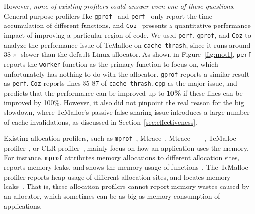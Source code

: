 However, \textit{none of existing profilers could answer even one of these questions}. General-purpose profilers like \texttt{gprof}~\cite{DBLP:conf/sigplan/GrahamKM82} and \texttt{perf}~\cite{perf} only report the time accumulation of different functions, and \texttt{Coz}~\cite{Coz} presents a quantitative performance impact of improving a particular region of code. We used \texttt{perf}, \texttt{gprof}, and \texttt{Coz} to analyze the performance issue of TcMalloc on \texttt{cache-thrash}, since it runs around $38\times$ slower than the default Linux allocator. As shown in Figure~\ref{fig:mot1}, \texttt{perf} reports the \texttt{worker} function as the primary function to focus on, which unfortunately has nothing to do with the allocator. \texttt{gprof} reports a similar result as \texttt{perf}. \texttt{Coz} reports lines 85-87 of \texttt{cache-thrash.cpp} as the major issue, and predicts that the performance can be improved up to \textbf{10\%} if these lines can be improved by 100\%. However, it 
also did not pinpoint the real reason for the big slowdown, where TcMalloc's passive false sharing issue introduces a large number of cache invalidations, as discussed in Section~\ref{sec:effectiveness}. 


Existing allocation profilers, such as \texttt{mprof}~\cite{Zorn:1988:MAP:894814}, Mtrace~\cite{mtrace}, Mtrace++~\cite{Lee:2000:DMM:786772.787150}, TcMalloc profiler~\cite{tcmalloc-profiler}, or CLR profiler~\cite{lupasc2014dynamic}, mainly focus on how an application uses the memory. For instance, \texttt{mprof} attributes memory allocations to different allocation sites, reports memory leaks, and shows the memory usage of functions~\cite{Zorn:1988:MAP:894814}. The TcMalloc profiler reports heap usage of different allocation sites, and locates memory leaks~\cite{tcmalloc-profiler}. That is, these allocation profilers cannot report memory wastes caused by an allocator, which sometimes can be as big as memory consumption of applications. 

